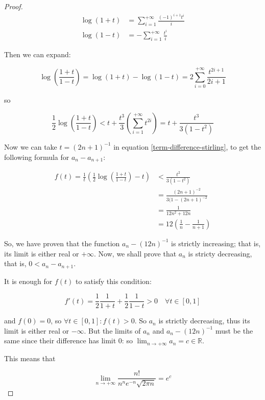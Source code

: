 \documentclass[12pt,a4paper]{report}
\numberwithin{equation}{section}
\theoremstyle{definition}
\theoremstyle{remark}
\begin{document}
\begin{proof}
\begin{align}
\log(1+t) &= \sum_{i=1}^{+\infty} \frac{(-1)^{i+1} t^i}{i}\\
\log(1-t) &= - \sum_{i=1}^{+\infty} \frac{t^i}{i}
\end{align}

Then we can expand:

\begin{equation}
\log\left(
\frac{1+t}{1-t}\right)
 = \log (1+t) -\log (1-t) = 2\sum_{i=0}^{+\infty} \frac{t^{2i+1}}{2i+1}
\end{equation}

so

\begin{equation}
\frac 12 \log \left( \frac{1+t}{1-t} \right) <
t + \frac{t^3}{3} \left(
\sum_{i=1}^{+\infty} t^{2i}
\right) = t + \frac{t^3}{3 (1-t^2)}
\end{equation}

Now we can take $t = (2n+1)^{-1}$ in equation \eqref{term-difference-stirling}, to get the following formula for $a_n - a_{n+1}$:

\begin{align}
f(t) = \frac 1t \left(
\frac 12 \log \left(\frac{1+t}{1-t}\right) -t
\right) &<
\frac{t^2}{3(1-t^2)} \\
&=
\frac{(2n+1)^{-2}}{3(1-(2n+1)^{-2}} \\ 
&= \frac 1{12n^2 + 12n} \\ 
&= 12 \left(\frac 1n - \frac{1}{n+1}\right)
\end{align}

So, we have proven that the function $a_n - (12 n) ^{-1}$ is strictly increasing; that is, its limit is either real or $+\infty$. Now, we shall prove that $a_n$ is stricty decreasing, that is, $0<a_n - a_{n+1}$.

It is enough for $f(t)$ to satisfy this condition:

\begin{equation}
f'(t) =\frac 12 \frac{1}{1+t} + \frac{1}{2} \frac{1}{1-t} > 0 \quad \forall t \in [0, 1]
\end{equation}

and $f(0) = 0$, so $\forall t \in [0, 1]: f(t)>0$. So $a_n$ is strictly decreasing, thus its limit is either real or $-\infty$. But the limits of $a_n$ and $a_n - (12n)^{-1}$ must be the same since their difference has limit 0: so $\lim_{n\rightarrow +\infty} a_n = c \in \mathbb{R}$.

This means that

\begin{equation}
\lim_{n\rightarrow +\infty} \frac{n!}{n^n e^{-n} \sqrt{2\pi n}} = e^c
\end{equation}


\end{proof}
\end{document}
